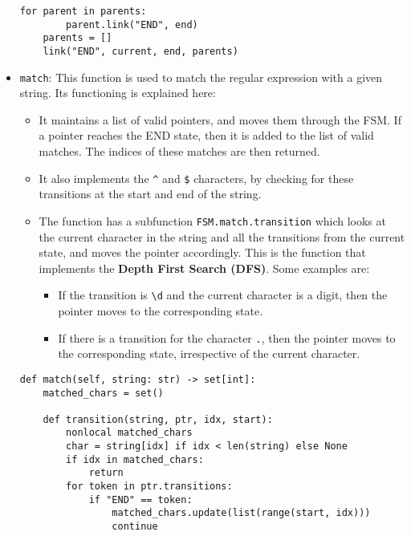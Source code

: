 \documentclass[12pt]{report}
\begin{document}
\begin{itemize}
\begin{lstlisting}[caption={\texttt{FSM.compile}}]
    for parent in parents:
        parent.link("END", end)
    parents = []
    link("END", current, end, parents)
                \end{lstlisting}
    \item \texttt{match}: This function is used to match the regular expression with a given string. Its functioning is explained here:
          \begin{itemize}
              \item It maintains a list of valid pointers, and moves them through the FSM. If a pointer reaches the END state, then it is added to the list of valid matches. The indices of these matches are then returned.
              \item It also implements the \texttt{\textasciicircum} and \texttt{\$} characters, by checking for these transitions at the start and end of the string.
              \item The function has a subfunction \texttt{FSM.match.transition} which looks at the current character in the string and all the transitions from the current state, and moves the pointer accordingly. This is the function that implements the \textbf{Depth First Search (DFS)}. Some examples are:

                    \begin{itemize}
                        \item If the transition is \texttt{\textbackslash d} and the current character is a digit, then the pointer moves to the corresponding state.
                        \item If there is a transition for the character \texttt{.}, then the pointer moves to the corresponding state, irrespective of the current character.
                    \end{itemize}
          \end{itemize}
          \begin{lstlisting}[caption={\texttt{FSM.match}}]
def match(self, string: str) -> set[int]:
    matched_chars = set()

    def transition(string, ptr, idx, start):
        nonlocal matched_chars
        char = string[idx] if idx < len(string) else None
        if idx in matched_chars:
            return
        for token in ptr.transitions:
            if "END" == token:
                matched_chars.update(list(range(start, idx)))
                continue


\end{lstlisting}
\end{itemize}
\end{document}
